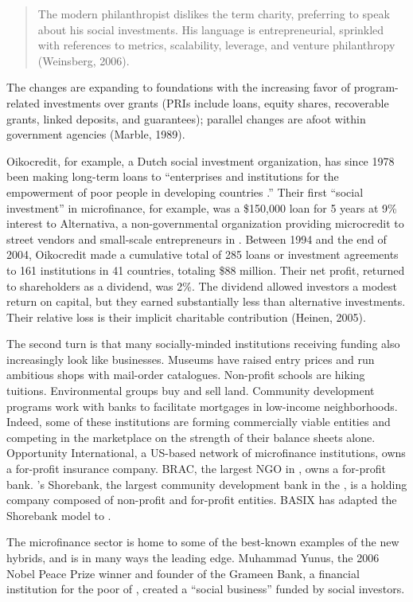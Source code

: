 \documentclass{article}
\begin{document}
\begin{quote}
The modern philanthropist dislikes the term charity, preferring to speak
about his social investments. His language is entrepreneurial, sprinkled
with references to metrics, scalability, leverage, and venture
philanthropy (Weinsberg, 2006).
\end{quote}

The changes are expanding to foundations with the increasing favor of
program-related investments over grants (PRIs include loans, equity
shares, recoverable grants, linked deposits, and guarantees); parallel
changes are afoot within government agencies (Marble, 1989).

Oikocredit, for example, a Dutch social investment organization, has
since 1978 been making long-term loans to ``enterprises and institutions
for the empowerment of poor people in developing countries .'' Their
first ``social investment'' in microfinance, for example, was a
\$150,000 loan for 5 years at 9\% interest to Alternativa, a
non-governmental organization providing microcredit to street vendors
and small-scale entrepreneurs in . Between 1994 and the end of 2004,
Oikocredit made a cumulative total of 285 loans or investment agreements
to 161 institutions in 41 countries, totaling \$88 million. Their net
profit, returned to shareholders as a dividend, was 2\%. The dividend
allowed investors a modest return on capital, but they earned
substantially less than alternative investments. Their relative loss is
their implicit charitable contribution (Heinen, 2005).

The second turn is that many socially-minded institutions receiving
funding also increasingly look like businesses. Museums have raised
entry prices and run ambitious shops with mail-order catalogues.
Non-profit schools are hiking tuitions. Environmental groups buy and
sell land. Community development programs work with banks to facilitate
mortgages in low-income neighborhoods. Indeed, some of these
institutions are forming commercially viable entities and competing in
the marketplace on the strength of their balance sheets alone.
Opportunity International, a US-based network of microfinance
institutions, owns a for-profit insurance company. BRAC, the largest NGO
in , owns a for-profit bank. 's Shorebank, the largest community
development bank in the , is a holding company composed of non-profit
and for-profit entities. BASIX has adapted the Shorebank model to .

The microfinance sector is home to some of the best-known examples of
the new hybrids, and is in many ways the leading edge. Muhammad Yunus,
the 2006 Nobel Peace Prize winner and founder of the Grameen Bank, a
financial institution for the poor of , created a ``social business''
funded by social investors.
\end{document}
